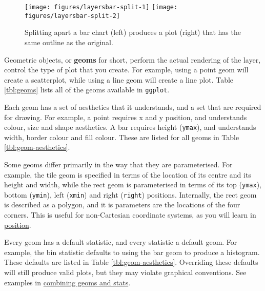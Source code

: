 \begin{figure}

{\centering \texttt{[image: figures/layersbar-split-1]} \texttt{[image: figures/layersbar-split-2]} 

}

\caption{Splitting apart a bar chart (left) produces a plot (right) that has the same outline as the original.\label{fig:bar-split}}
\end{figure}


Geometric objects, or \textbf{geoms} for short, perform the actual
rendering of the layer, control the type of plot that you create. For
example, using a point geom will create a scatterplot, while using a
line geom will create a line plot. Table \ref{tbl:geoms} lists all of
the geoms available in \texttt{ggplot}.

Each geom has a set of aesthetics that it understands, and a set that
are required for drawing. For example, a point requires x and y
position, and understands colour, size and shape aesthetics. A bar
requires height (\texttt{ymax}), and understands width, border colour
and fill colour. These are listed for all geoms in Table
\ref{tbl:geom-aesthetics}. 

Some geoms differ primarily in the way that they are parameterised. For
example, the tile geom is specified in terms of the location of its
centre and its height and width, while the rect geom is parameterised in
terms of its top (\texttt{ymax}), bottom (\texttt{ymin}), left
(\texttt{xmin}) and right (\texttt{right}) positions. 
Internally, the rect geom is described as a polygon, and it is
parameters are the locations of the four corners. This is useful for
non-Cartesian coordinate systems, as you will learn in
\hyperref[cha:position]{position}. 

Every geom has a default statistic, and every statistic a default geom.
For example, the bin statistic defaults to using the bar geom to produce
a histogram. These defaults are listed in Table
\ref{tbl:geom-aesthetics}. Overriding these defaults will still produce
valid plots, but they may violate graphical conventions. See examples in
\hyperref[sub:new-plot-types]{combining geoms and stats}.

